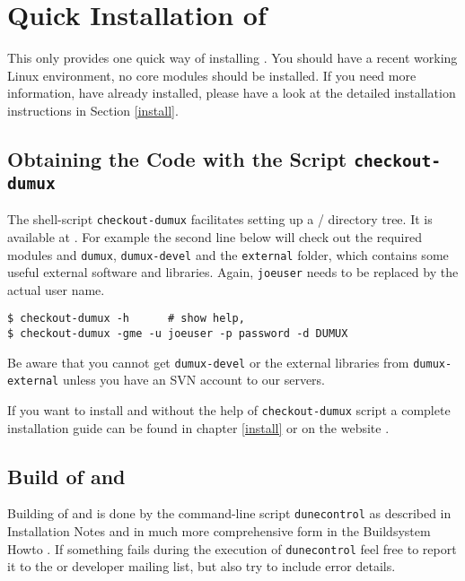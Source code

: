 \section{Quick Installation of \Dumux}
\label{quick-install}

This only provides one quick way of installing \Dumux.
You should have a recent working Linux environment, no \Dune core modules should be installed.
If you need more information,
have \Dune already installed, please have a look at the detailed installation
instructions in Section \ref{install}.

\subsection{Obtaining the Code with the Script \texttt{checkout-dumux}}

The shell-script \texttt{checkout-dumux} facilitates setting up a {\Dune}/{\Dumux} directory tree.
It is available at \cite{DUMUX-DOWNLOAD}.
For example the second line below will check out the required \Dune modules and \texttt{dumux},
\texttt{dumux-devel} and the \texttt{external} folder, which contains some useful external software and libraries.
Again,  \texttt{joeuser} needs to be replaced by the actual user name.
\begin{lstlisting}[style=Bash]
$ checkout-dumux -h      # show help,
$ checkout-dumux -gme -u joeuser -p password -d DUMUX
\end{lstlisting}

Be aware that you cannot get \texttt{dumux-devel} or the external libraries from \texttt{dumux-external} unless
you have an SVN account to our servers.

If you want to install \Dune and \Dumux without the help of \texttt{checkout-dumux} script a complete installation
guide can be found in chapter \ref{install} or on the \Dune website \cite{DUNE-INST}.

\subsection{Build of \Dune and \Dumux}
\label{buildIt}
Building of \Dune and \Dumux is done by the command-line script \texttt{dunecontrol} as described in \Dune Installation Notes \cite{DUNE-INST}
and in much more comprehensive form in the \Dune Buildsystem Howto \cite{DUNE-BS}.
If something fails during the execution of \texttt{dunecontrol} feel free to report it to the \Dune or \Dumux developer mailing list,
but also try to include error details.

